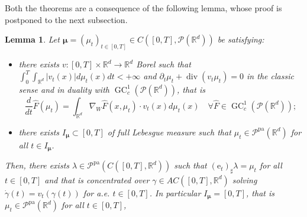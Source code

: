 \documentclass[10pt,leqno]{amsart}
\numberwithin{equation}{section}
\newtheorem{lemma}[teorema]{Lemma}
\newcommand{\R}{\mathbb{R}}
\newcommand{\PP}{\mathcal{P}}
\newcommand{\PPpa}{\PP^{\operatorname{pa}}}
\newcommand{\e}{\mathrm{e}}
\begin{document}
Both the theorems are a consequence of the following lemma, whose proof is postponed to the next subsection.

\begin{lemma}\label{lemma: main}
    Let $\boldsymbol{\mu} = (\mu_t)_{t\in[0,T]}\in C([0,T],\PP(\R^d))$ be satisfying:
    \begin{itemize}
        \item[(H1)] there exists $v:[0,T]\times \R^d \to \R^d$ Borel such that $\int_0^T \int_{\R^d} |v
        _t(x)| d\mu_t(x) dt<+\infty$ and $\partial_t\mu_t + \operatorname{div}(v_t\mu_t) = 0$ in the classic sense and in duality with $\operatorname{GC}_c^1(\PP(\R^d))$, that is
        \begin{equation}
        \frac{d}{dt} \hat{F}(\mu_t) = \int_{\R^d} \nabla_W\hat{F}(x,\mu_t) \cdot  v_t(x) d\mu_t(x) \quad \forall \hat{F}\in \operatorname{GC}_c^1(\PP(\R^d));
    \end{equation}
        \item[(H2)] there exists $I_{\boldsymbol{\mu}} \subset [0,T]$ of full Lebesgue measure such that $\mu_t \in \PPpa(\R^d)$ for all $t\in I_{\boldsymbol{\mu}}$.
    \end{itemize}
    Then, there exists $\lambda \in \PPpa(C([0,T],\R^d))$ such that $(\e_t)_\sharp\lambda = \mu_t$ for all $t\in [0,T]$ and that is concentrated over $\gamma \in AC([0,T],\R^d)$ solving $\dot{\gamma}(t) = v_t(\gamma(t))$ for a.e. $t\in [0,T]$. In particular $I_{\boldsymbol{\mu}} = [0,T]$, that is $\mu_t\in \PPpa(\R^d)$ for all $t\in[0,T]$, 
\end{lemma}
\end{document}
